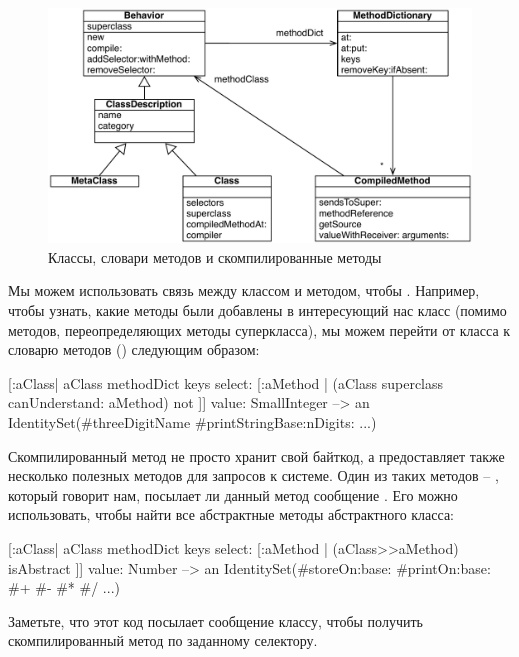 \documentclass[a4paper,10pt,twoside]{book}
\begin{document}
{\begin{figure}[ht]\centering
	\includegraphics[width=\linewidth]{MethodsAsObjects}
	\caption{Классы, словари методов и скомпилированные методы\figlabel{MethodsAsObjects}}
\end{figure}

Мы можем использовать связь между классом и методом, чтобы .
Например, чтобы узнать, какие методы были добавлены в интересующий нас класс (помимо методов, переопределяющих методы суперкласса), мы можем перейти от класса к словарю методов () следующим образом:
\begin{code}{}
[:aClass| aClass methodDict keys select: [:aMethod |
  (aClass superclass canUnderstand: aMethod) not ]] value: SmallInteger
  --> an IdentitySet(#threeDigitName #printStringBase:nDigits: ...)
\end{code}

Скомпилированный метод не просто хранит свой байткод,
а предоставляет также несколько полезных методов для запросов к системе.
Один из таких методов -- , который говорит нам, посылает ли данный метод сообщение .
Его можно использовать, чтобы найти все абстрактные методы абстрактного класса:
\begin{code}{}
[:aClass| aClass methodDict keys select: [:aMethod |
  (aClass>>aMethod) isAbstract ]] value: Number
  --> an IdentitySet(#storeOn:base: #printOn:base: #+ #- #* #/ ...)
\end{code}
Заметьте, что этот код посылает сообщение \ct{>>} классу, чтобы получить скомпилированный метод по заданному селектору.

}
\end{document}
